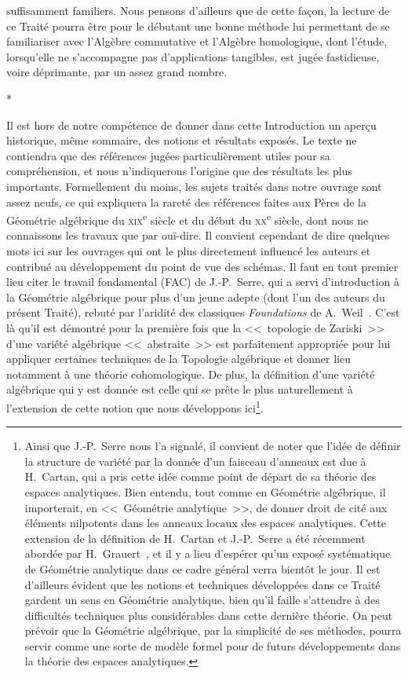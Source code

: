suffisamment familiers.
Nous pensons d'ailleurs que de cette façon, la lecture de ce Traité pourra être pour le débutant une bonne méthode lui permettant de se familiariser avec l'Algèbre commutative et l'Algèbre homologique, dont l'étude, lorsqu'elle ne s'accompagne pas d'applications tangibles, est jugée fastidieuse, voire déprimante, par un assez grand nombre.

\bigskip
\begin{center}*\quad*\quad*\end{center}
\bigskip

Il est hors de notre compétence de donner dans cette Introduction un aperçu historique, même sommaire, des notions et résultats exposés.
Le texte ne contiendra que des références jugées particulièrement utiles pour sa compréhension, et nous n'indiquerons l'origine que des résultats les plus importants.
Formellement du moins, les sujets traités dans notre ouvrage sont assez neufs, ce qui expliquera la rareté des références faites aux Pères de la Géométrie algébrique du \textsc{xix}\textsuperscript{e} siècle et du début du \textsc{xx}\textsuperscript{e} siècle, dont nous ne connaissons les travaux que par ouï-dire.
Il convient cependant de dire quelques mots ici sur les ouvrages qui ont le plus directement influencé les auteurs et contribué au développement du point de vue des schémas.
Il faut en tout premier lieu citer le travail fondamental (FAC) de J.-P.~Serre, qui a servi d'introduction à la Géométrie algébrique pour plus d'un jeune adepte (dont l'un des auteurs du présent Traité), rebuté par l'aridité des classiques \emph{Foundations} de A.~Weil~\cite{I-18}.
C'est là qu'il est démontré pour la première fois que la <<~topologie de Zariski~>> d'une variété algébrique <<~abstraite~>> est parfaitement appropriée pour lui appliquer certaines techniques de la Topologie algébrique et donner lieu notamment à une théorie cohomologique.
De plus, la définition d'une variété algébrique qui y est donnée est celle qui se prête le plus naturellement à l'extension de cette notion que nous développons ici\footnote{Ainsi que J.-P.~Serre nous l'a signalé, il convient de noter que l'idée de définir la structure de variété par la donnée d'un faisceau d'anneaux est due à H.~Cartan, qui a pris cette idée comme point de départ de sa théorie des espaces analytiques.
Bien entendu, tout comme en Géométrie algébrique, il importerait, en <<~Géométrie analytique~>>, de donner droit de cité aux éléments nilpotents dans les anneaux locaux des espaces analytiques.
Cette extension de la définition de H.~Cartan et J.-P.~Serre a été récemment abordée par H.~Grauert~\cite{I-5}, et il y a lieu d'espérer qu'un exposé systématique de Géométrie analytique dans ce cadre général verra bientôt le jour.
Il est d'ailleurs évident que les notions et techniques développées dans ce Traité gardent un sens en Géométrie analytique, bien qu'il faille s'attendre à des difficultés techniques plus considérables dans cette dernière théorie.
On peut prévoir que la Géométrie algébrique, par la simplicité de ses méthodes, pourra servir comme une sorte de modèle formel pour de futurs développements dans la théorie des espaces analytiques.}.
